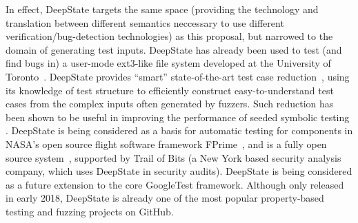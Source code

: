In effect, DeepState targets the same space (providing the technology and translation between different semantics neccessary to use different verification/bug-detection technologies) as this proposal, but narrowed to the domain of generating test inputs.
DeepState has already been used to test (and find bugs in) a user-mode ext3-like file system developed at the University of Toronto~\cite{testfs,testfsrepo}. DeepState provides ``smart'' state-of-the-art test case reduction~\cite{OneTest}, using its knowledge of test structure to efficiently construct easy-to-understand test cases from the complex inputs often generated by fuzzers.  Such reduction has been shown to be useful in improving the performance of seeded symbolic testing \cite{issta14}.
DeepState is being considered as a basis for automatic testing for components in NASA's open source flight software framework FPrime~\cite{fprime,fprimerepo}, and is a fully open source system~\cite{deepstaterepo}, supported by Trail of Bits (a New York based security analysis company, which uses DeepState in security audits).  DeepState is being considered as a future extension to the core GoogleTest framework.  Although only released in early 2018, DeepState is already one of the most popular property-based testing and fuzzing projects on GitHub.